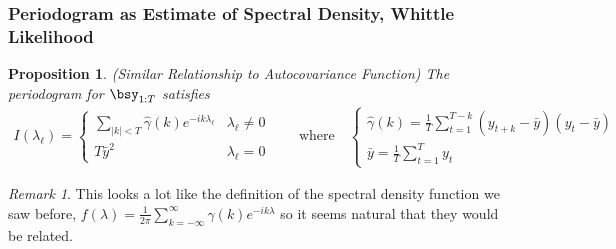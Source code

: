 \documentclass[12pt]{article}
\theoremstyle{plain}
\newtheorem{prop}[thm]{Proposition}
\theoremstyle{definition}
\theoremstyle{remark}
\newtheorem*{rmk}{Remark}
\newcommand{\sumtT}{\sum^T_{t=1}}
\begin{document}
\clearpage
\subsubsection{Periodogram as Estimate of Spectral Density, Whittle
Likelihood}

\begin{prop}\emph{(Similar Relationship to Autocovariance Function)}
The periodogram for $\bsy_{1:T}$ satisfies
\begin{align*}
  I(\lambda_\ell)
  =
  \begin{cases}
  \sum_{|k|<T} \hat{\gamma}(k)e^{-ik\lambda_\ell}
  & \lambda_\ell \neq 0
  \\
  T \bar{y}^2 & \lambda_\ell=0
  \end{cases}
  \qquad
  \text{where}\quad
  \begin{cases}
  \hat{\gamma}(k)
  = \frac{1}{T}\sum_{t=1}^{T-k}
    (y_{t+k}-\bar{y})
    (y_{t}-\bar{y})
  \\
  \bar{y} = \frac{1}{T} \sumtT y_t
  \end{cases}
\end{align*}
\end{prop}
\begin{rmk}
This looks a lot like the definition of the spectral density function we
saw before,
$f(\lambda) =
\frac{1}{2\pi}\sum_{k=-\infty}^\infty \gamma(k)
e^{-ik\lambda}$
so it seems natural that they would be related.
\end{rmk}
\end{document}

